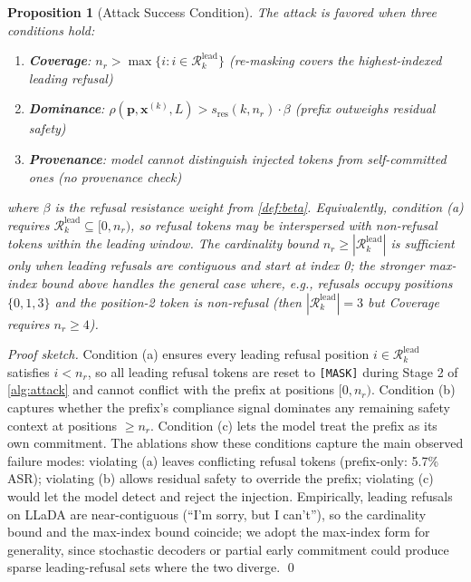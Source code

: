 \documentclass{article}
\theoremstyle{coloredthm}
\newtheorem{proposition}{Proposition}
\newcommand{\maskid}{\texttt{[MASK]}}
\begin{document}
\begin{proposition}[Attack Success Condition]
\label{prop:safety}
The attack is favored when three conditions hold:
\begin{enumerate}
    \item[(a)] \textbf{Coverage}: $n_r > \max\{i : i \in \mathcal{R}^{\text{lead}}_k\}$ \hfill (re-masking covers the highest-indexed leading refusal)
    \item[(b)] \textbf{Dominance}: $\rho(\mathbf{p}, \mathbf{x}^{(k)}, L) > s_{\text{res}}(k, n_r) \cdot \beta$ \hfill (prefix outweighs residual safety)
    \item[(c)] \textbf{Provenance}: model cannot distinguish injected tokens from self-committed ones \hfill (no provenance check)
\end{enumerate}
where $\beta$ is the refusal resistance weight from \cref{def:beta}. Equivalently, condition (a) requires $\mathcal{R}^{\text{lead}}_k \subseteq [0, n_r)$, so refusal tokens may be interspersed with non-refusal tokens within the leading window. The cardinality bound $n_r \geq |\mathcal{R}^{\text{lead}}_k|$ is sufficient only when leading refusals are contiguous and start at index 0; the stronger max-index bound above handles the general case where, e.g., refusals occupy positions $\{0, 1, 3\}$ and the position-2 token is non-refusal (then $|\mathcal{R}^{\text{lead}}_k| = 3$ but Coverage requires $n_r \geq 4$).
\end{proposition}

\textit{Proof sketch.} Condition (a) ensures every leading refusal position $i \in \mathcal{R}^{\text{lead}}_k$ satisfies $i < n_r$, so all leading refusal tokens are reset to \maskid{} during Stage 2 of \cref{alg:attack} and cannot conflict with the prefix at positions $[0, n_r)$. Condition (b) captures whether the prefix's compliance signal dominates any remaining safety context at positions $\geq n_r$. Condition (c) lets the model treat the prefix as its own commitment. The ablations show these conditions capture the main observed failure modes: violating (a) leaves conflicting refusal tokens (prefix-only: 5.7\% ASR); violating (b) allows residual safety to override the prefix; violating (c) would let the model detect and reject the injection. Empirically, leading refusals on LLaDA are near-contiguous (``I'm sorry, but I can't''), so the cardinality bound and the max-index bound coincide; we adopt the max-index form for generality, since stochastic decoders or partial early commitment could produce sparse leading-refusal sets where the two diverge. \qed
\end{document}
